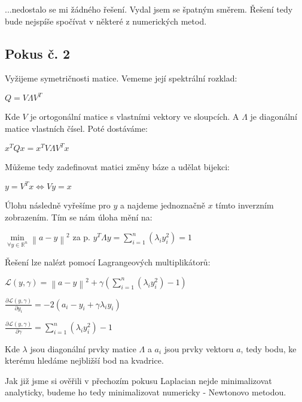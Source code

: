 \documentclass[10pt,a4paper,openright]{article}
\newcommand{\norm}[1]{\left\lVert#1\right\rVert}
\begin{document}
...nedostalo se mi žádného řešení. Vydal jsem se špatným směrem.
Řešení tedy bude nejspíše spočívat v některé z numerických metod.

\subsection{Pokus č. 2}
Vyžijeme symetričnosti matice. Vememe její spektrální rozklad:

\begin{center}
	$Q = V \Lambda V^T$
\end{center}

Kde $V$ je ortogonální matice s vlastními vektory ve sloupcích.
A $\Lambda$ je diagonální matice vlastních čísel.
Poté dostáváme:

\begin{center}
	$x^T Q x = x^T V \Lambda V^T x$
\end{center}

Můžeme tedy zadefinovat matici změny báze a udělat bijekci:

\begin{center}
	$y = V^Tx \iff Vy=x$
\end{center}

Úlohu následně vyřešíme pro $y$ a najdeme jednoznačně $x$ tímto inverzním zobrazením.
Tím se nám úloha mění na:

\begin{center}
	$\min\limits_{\forall y \in \mathbb{R}^ n} \norm{a - y}^2$ za p. $y^T \Lambda y = \sum^{n}_{i=1}(\lambda_i y_i^2) = 1$
\end{center}

Řešení lze nalézt pomocí Lagrangeových multiplikátorů:

\begin{center}
	$\mathcal{L}(y, \gamma) = \norm{a - y}^2 + \gamma (\sum^{n}_{i=1} (\lambda_i y_i^2) - 1)$
	
	\vspace{.2cm}
	
	$\frac{\partial \mathcal{L}(y, \gamma)}{\partial y_i} = -2(a_i - y_i + \gamma \lambda_i y_i)$

	\vspace{.2cm}

	$\frac{\partial \mathcal{L}(y, \gamma)}{\partial \gamma} = \sum^{n}_{i=1}(\lambda_i y_i^2)-1$
\end{center}

Kde $\lambda$ jsou diagonální prvky matice $\Lambda$ a $a_i$ jsou prvky vektoru $a$, tedy bodu,
ke kterému hledáme nejbližší bod na kvadrice.

Jak již jsme si ověřili v přechozím pokusu Laplacian nejde minimalizovat analyticky,
budeme ho tedy minimalizovat numericky - Newtonovo metodou.
\end{document}

